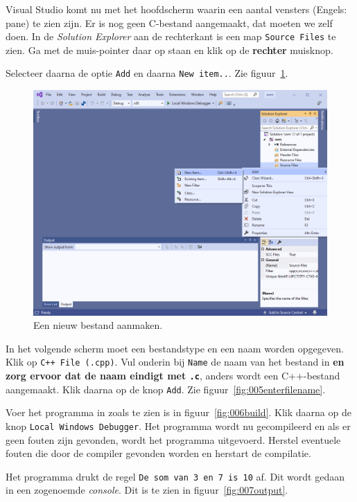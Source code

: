 \documentclass[a4paper,10pt,fleqn,twoside]{article}
\begin{document}
Visual Studio komt nu met het hoofdscherm waarin een aantal vensters (Engels: pane) te zien zijn. Er is nog geen C-bestand aangemaakt, dat moeten we zelf doen. In de \textsl{Solution Explorer} aan de rechterkant is een map \texttt{Source Files} te zien. Ga met de muis-pointer daar op staan en klik op de \textbf{rechter} muisknop.

Selecteer daarna de optie \texttt{Add} en daarna \texttt{New item..}. Zie figuur~\ref{fig:004addnewitem}.

\begin{figure}[H]
\centering
\includegraphics[scale=0.5]{004addnewitem}
\caption{Een nieuw bestand aanmaken.}
\label{fig:004addnewitem}
\end{figure}

In het volgende scherm moet een bestandstype en een naam worden opgegeven. Klik op \texttt{C++ File (.cpp)}. Vul onderin bij  \texttt{Name} de naam van het bestand in \textbf{en zorg ervoor dat de naam eindigt met \texttt{.c}}, anders wordt een C++-bestand aangemaakt. Klik daarna op de knop \texttt{Add}. Zie figuur~\ref{fig:005enterfilename}.

Voer het programma in zoals te zien is in figuur~\ref{fig:006build}. Klik daarna op de knop \texttt{Local Windows Debugger}. Het programma wordt nu gecompileerd en als er geen fouten zijn gevonden, wordt het programma uitgevoerd. Herstel eventuele fouten die door de compiler gevonden worden en herstart de compilatie.

Het programma drukt de regel \texttt{De som van 3 en 7 is 10} af. Dit wordt gedaan in een zogenoemde \textsl{console}. Dit is te zien in figuur~\ref{fig:007output}.
\end{document}
